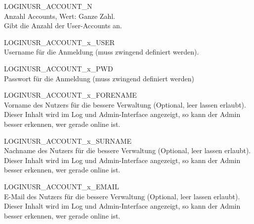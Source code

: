 \begin{description}


  LOGINUSR\_ACCOUNT\_N\\
  Anzahl Accounts, Wert: Ganze Zahl.\\
  Gibt die Anzahl der User-Accounts an.



  LOGINUSR\_ACCOUNT\_x\_USER\\
  Username für die Anmeldung (muss zwingend definiert werden).



  LOGINUSR\_ACCOUNT\_x\_PWD\\
  Passwort für die Anmeldung (muss zwingend definiert werden)



  LOGINUSR\_ACCOUNT\_x\_FORENAME\\
  Vorname des Nutzers für die bessere Verwaltung (Optional, leer lassen erlaubt).
  Dieser Inhalt wird im Log und Admin-Interface angezeigt, so kann der Admin
  besser erkennen, wer gerade online ist.



  LOGINUSR\_ACCOUNT\_x\_SURNAME\\
  Nachname des Nutzers für die bessere Verwaltung (Optional, leer lassen erlaubt).
  Dieser Inhalt wird im Log und Admin-Interface angezeigt, so kann der Admin
  besser erkennen, wer gerade online ist.



  LOGINUSR\_ACCOUNT\_x\_EMAIL\\
  E-Mail des Nutzers für die bessere Verwaltung (Optional, leer lassen erlaubt).
  Dieser Inhalt wird im Log und Admin-Interface angezeigt, so kann der Admin
  besser erkennen, wer gerade online ist.


\end{description}
